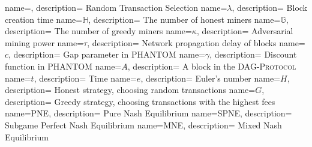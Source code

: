 

{
	name={},
	description={
		Random Transaction Selection
	}
}
{
    name={\ensuremath{\lambda}},
    description={
            Block creation time
        }
}
{
    name={\ensuremath{\mathbb{H}}},
    description={
            The number of honest miners
        }
}
{
    name={\ensuremath{\mathbb{G}}},
    description={
            The number of greedy miners
        }
}
{
    name={\ensuremath{\kappa}},
    description={
            Adversarial mining power
        }
}
{
    name={\ensuremath{\tau}},
    description={
            Network propagation delay of blocks
        }
}
{
    name={\ensuremath{c}},
    description={
            Gap parameter in PHANTOM
        }
}
{
    name={\ensuremath{\gamma}},
    description={
            Discount function in PHANTOM
        }
}
{
    name={\ensuremath{A}},
    description={
            A block in the \textsc{DAG-Protocol}
        }
}
{
    name={\ensuremath{t}},
    description={
            Time
        }
}
{
    name={\ensuremath{e}},
    description={
            Euler's number
        }
}
{
	name={\ensuremath{H}},
	description={
		Honest strategy, choosing random transactions
	}
}
{
	name={\ensuremath{G}},
	description={
		Greedy strategy, choosing transactions with the highest fees
	}
}
{
	name={PNE},
	description={
		Pure Nash Equilibrium
	}
}
{
	name={SPNE},
	description={
		Subgame Perfect Nash Equilibrium
	}
}
{
	name={MNE},
	description={
		Mixed Nash Equilibrium
	}
}


